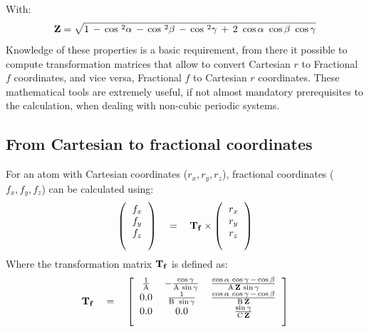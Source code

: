 \documentclass[9pt,tutorial]{livecoms}
\newcommand{\boxA}{\text{A}}
\newcommand{\boxB}{\text{B}}
\newcommand{\boxC}{\text{C}}
\newcommand{\Tf}{{\text{\bf{T}}_{\bf{f}}}}
\begin{document}
With:
\begin{equation}
{\bf{Z}} = \sqrt{1\, -\, \cos\,^2{\alpha}\, -\, \cos\,^2{\beta}\, -\, \cos\,^2{\gamma}\, +\, 2\ \cos{\alpha}\ \cos{\beta}\ \cos{\gamma}}
\end{equation}
Knowledge of these properties is a basic requirement, from there it possible to compute transformation matrices 
that allow to convert Cartesian $r$ to Fractional $f$ coordinates, and vice versa, Fractional $f$ to Cartesian $r$ coordinates. 
These mathematical tools are extremely useful, if not almost mandatory prerequisites to the calculation, when dealing with non-cubic periodic systems.

\subsection{From Cartesian to fractional coordinates}
\noindent For an atom with Cartesian coordinates ($r_x, r_y, r_z$), fractional coordinates ($f_x, f_y, f_z$) can be calculated using:
\begin{equation}
\label{c2f}
\left( \begin{blockarray}{c}
 f_x \\
 f_y \\
 f_z
\end{blockarray} \right)
\quad = \quad \Tf 
\times
\left( \begin{blockarray}{c}
 r_x \\
 r_y \\
 r_z
\end{blockarray} \right)
\end{equation}
Where the transformation matrix $\Tf$ is defined as:
\begin{equation}
\Tf \quad = \quad
\left[ \begin{blockarray}{ccc} 
 \frac{1}{\boxA} & - \frac{\cos{\gamma}}{\boxA\,  \sin{\gamma}} & \frac{\cos{\alpha} \, \cos{\gamma}\, -\, \cos{\beta}}{\boxA \, {\bf{Z}}\, \sin{\gamma}} \\
 0.0 & \frac{1}{\boxB\ \sin{\gamma}} & \frac{\cos{\alpha} \, \cos{\gamma}\, -\, \cos{\beta}}{\boxB \, {\bf{Z}}} \\  
 0.0 & 0.0 & \frac{\sin{\gamma}}{\boxC \, {\bf{Z}}}
\end{blockarray} \right]
\end{equation}
\end{document}
